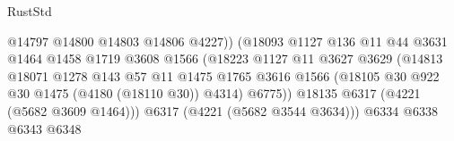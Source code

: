 \begin{lexlean}{RustStd}
\begin{coremodule}
                                                @14797
                                                @14800
                                                @14803
                                                @14806
                                                @4227))
                                            (@18093
                                              @1127
                                              @136
                                              @11
                                              @44
                                              @3631
                                              @1464
                                              @1458
                                              @1719
                                              @3608
                                              @1566
                                              (@18223
                                                @1127
                                                @11
                                                @3627
                                                @3629
                                                (@14813
                                                  @18071
                                                  @1278
                                                  @143
                                                  @57
                                                  @11
                                                  @1475
                                                  @1765
                                                  @3616
                                                  @1566
                                                  (@18105
                                                    @30
                                                    @922
                                                    @30
                                                    @1475
                                                    (@4180 (@18110 @30))
                                                    @4314)
                                                  @6775))
                                              @18135
                                              @6317
                                              (@4221 (@5682 @3609 @1464)))
                                            @6317
                                            (@4221 (@5682 @3544 @3634)))
                                          @6334
                                          @6338
                                          @6343
                                          @6348

\end{coremodule}
\end{lexlean}

